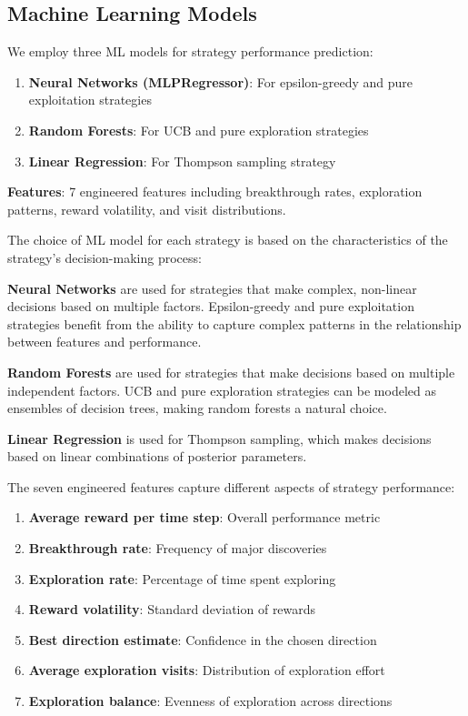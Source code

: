 \documentclass[letterpaper]{article} %
\begin{document}
\subsection{Machine Learning Models}

We employ three ML models for strategy performance prediction:

\begin{enumerate}
\item \textbf{Neural Networks (MLPRegressor)}: For epsilon-greedy and pure exploitation strategies
\item \textbf{Random Forests}: For UCB and pure exploration strategies  
\item \textbf{Linear Regression}: For Thompson sampling strategy
\end{enumerate}

\textbf{Features}: 7 engineered features including breakthrough rates, exploration patterns, reward volatility, and visit distributions.

The choice of ML model for each strategy is based on the characteristics of the strategy's decision-making process:

\textbf{Neural Networks} are used for strategies that make complex, non-linear decisions based on multiple factors. Epsilon-greedy and pure exploitation strategies benefit from the ability to capture complex patterns in the relationship between features and performance.

\textbf{Random Forests} are used for strategies that make decisions based on multiple independent factors. UCB and pure exploration strategies can be modeled as ensembles of decision trees, making random forests a natural choice.

\textbf{Linear Regression} is used for Thompson sampling, which makes decisions based on linear combinations of posterior parameters.

The seven engineered features capture different aspects of strategy performance:

\begin{enumerate}
\item \textbf{Average reward per time step}: Overall performance metric
\item \textbf{Breakthrough rate}: Frequency of major discoveries
\item \textbf{Exploration rate}: Percentage of time spent exploring
\item \textbf{Reward volatility}: Standard deviation of rewards
\item \textbf{Best direction estimate}: Confidence in the chosen direction
\item \textbf{Average exploration visits}: Distribution of exploration effort
\item \textbf{Exploration balance}: Evenness of exploration across directions
\end{enumerate}
\end{document}
